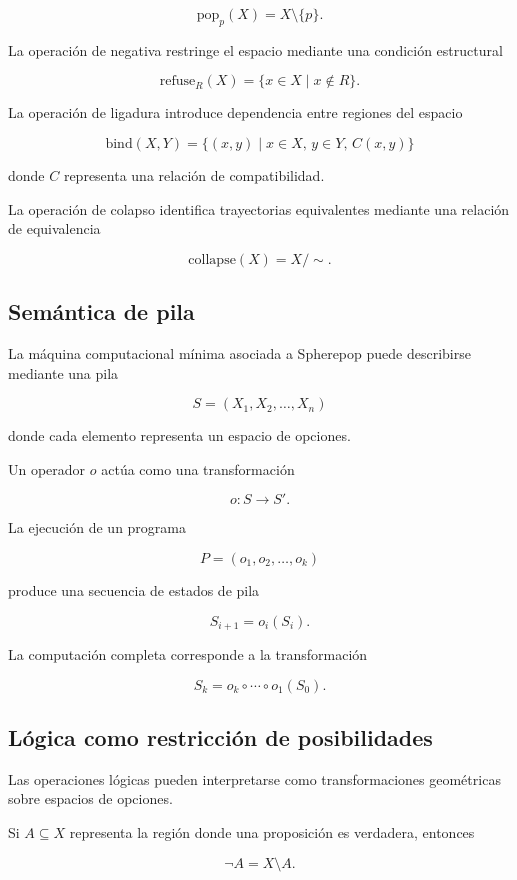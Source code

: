 \documentclass[12pt]{article}
\begin{document}
\[
\mathrm{pop}_p(X) = X \setminus \{p\}.
\]

La operación de negativa restringe el espacio mediante una condición estructural

\[
\mathrm{refuse}_R(X) = \{x \in X \mid x \notin R\}.
\]

La operación de ligadura introduce dependencia entre regiones del espacio

\[
\mathrm{bind}(X,Y) = \{(x,y) \mid x \in X,\, y \in Y,\, C(x,y)\}
\]

donde \(C\) representa una relación de compatibilidad.

La operación de colapso identifica trayectorias equivalentes mediante una relación de equivalencia

\[
\mathrm{collapse}(X) = X / \sim .
\]

\subsection{Semántica de pila}

La máquina computacional mínima asociada a Spherepop puede describirse mediante una pila

\[
S = (X_1,X_2,\ldots,X_n)
\]

donde cada elemento representa un espacio de opciones.

Un operador \(o\) actúa como una transformación

\[
o : S \rightarrow S'.
\]

La ejecución de un programa

\[
P = (o_1,o_2,\ldots,o_k)
\]

produce una secuencia de estados de pila

\[
S_{i+1} = o_i(S_i).
\]

La computación completa corresponde a la transformación

\[
S_k = o_k \circ \cdots \circ o_1(S_0).
\]

\subsection{Lógica como restricción de posibilidades}

Las operaciones lógicas pueden interpretarse como transformaciones geométricas sobre espacios de opciones.

Si \(A\subseteq X\) representa la región donde una proposición es verdadera, entonces

\[
\neg A = X \setminus A .
\]
\end{document}
